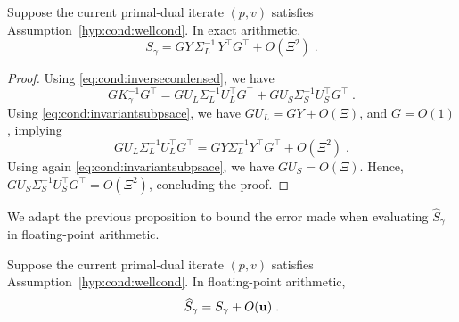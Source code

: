 \begin{proposition}
  Suppose the current primal-dual iterate $(p, v)$ satisfies Assumption~\ref{hyp:cond:wellcond}.
  In exact arithmetic,
  \begin{equation}
    S_\gamma = GY \, \Sigma_L^{-1} \, Y^\top G^\top + O(\Xi^2) \; .
  \end{equation}
\end{proposition}
\begin{proof}
  Using \eqref{eq:cond:inversecondensed}, we have
  \begin{equation}
    G K_\gamma^{-1} G^\top =
    G U_L \Sigma_L^{-1} U_L^\top G^\top + G U_S \Sigma_S^{-1} U_S^\top G^\top \;.
  \end{equation}
  Using \eqref{eq:cond:invariantsubpsace}, we have $G U_L = GY + O(\Xi)$,
  and $G = O(1)$, implying
  \begin{equation}
    G U_L \Sigma_L^{-1} U_L^\top G^\top = G Y  \Sigma_L^{-1} Y^\top G^\top + O(\Xi^2) \; .
  \end{equation}
  Using again \eqref{eq:cond:invariantsubpsace}, we have $G U_S = O(\Xi)$.
  Hence, $G U_S \Sigma_S^{-1} U_S^\top G^\top = O(\Xi^2)$,
  concluding the proof.
\end{proof}
We adapt the previous proposition to bound the error made when evaluating
$\widehat{S}_\gamma$ in floating-point arithmetic.
\begin{proposition}
  Suppose the current primal-dual iterate $(p, v)$ satisfies Assumption~\ref{hyp:cond:wellcond}.
  In floating-point arithmetic,
  \begin{equation}
    \label{eq:cond:errorSgamma}
    \widehat{S}_\gamma = S_\gamma + O(\mathbf{u}) \; .
  \end{equation}
\end{proposition}
